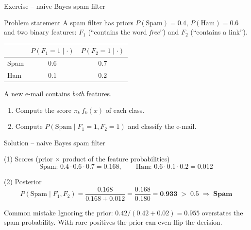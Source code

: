 \documentclass[aspectratio=169,11pt]{beamer}
\begin{document}
\begin{frame}{Exercise -- naive Bayes spam filter}
  \begin{block}{Problem statement}
    A spam filter has priors $P(\text{Spam})=0.4$, $P(\text{Ham})=0.6$ and two
    binary features: $F_1$ (``contains the word \emph{free}'') and $F_2$
    (``contains a link'').
    \begin{center}
      \renewcommand{\arraystretch}{1.2}
      \begin{tabular}{lcc}
        \toprule
        & $P(F_1=1\mid\cdot)$ & $P(F_2=1\mid\cdot)$\\
        \midrule
        Spam & $0.6$ & $0.7$\\
        Ham & $0.1$ & $0.2$\\
        \bottomrule
      \end{tabular}
    \end{center}
    A new e-mail contains \emph{both} features.
    \begin{enumerate}
      \item Compute the score $\pi_k\,f_k(x)$ of each class.
      \item Compute $P(\text{Spam}\mid F_1=1,F_2=1)$ and classify the e-mail.
    \end{enumerate}
  \end{block}
\end{frame}

\begin{frame}{Solution -- naive Bayes spam filter}
  \begin{exampleblock}{(1) Scores (prior $\times$ product of the feature probabilities)}
    \[
      \text{Spam: } 0.4\cdot0.6\cdot0.7=0.168,
      \qquad
      \text{Ham: } 0.6\cdot0.1\cdot0.2=0.012
    \]
  \end{exampleblock}
  \begin{exampleblock}{(2) Posterior}
    \[
      P(\text{Spam}\mid F_1,F_2)=\frac{0.168}{0.168+0.012}=\frac{0.168}{0.180}=\textbf{0.933}
      \;>\;0.5\;\Rightarrow\;\textbf{Spam}
    \]
  \end{exampleblock}
  \begin{alertblock}{Common mistake}
    Ignoring the prior: $0.42/(0.42+0.02)=0.955$ overstates the spam
    probability. With rare positives the prior can even flip the decision.
  \end{alertblock}
\end{frame}
\end{document}
